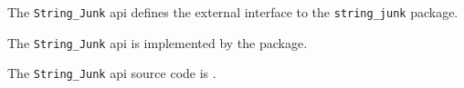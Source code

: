 
The {\tt String\_Junk} api defines the external interface to the {\tt string\_junk} package.

The {\tt String\_Junk} api is implemented by the  package.

The {\tt String\_Junk} api source code is .


